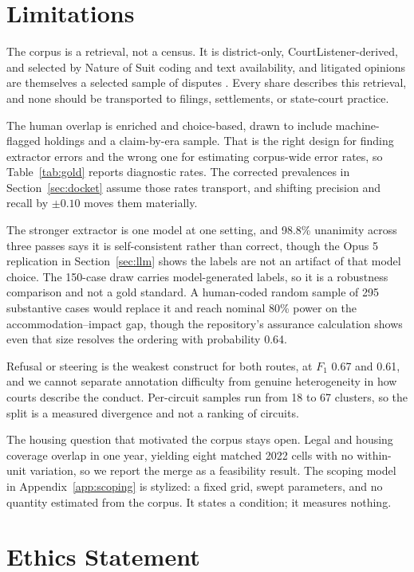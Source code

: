 \documentclass[11pt]{article}
\begin{document}
\section*{Limitations}

The corpus is a retrieval, not a census. It is district-only, CourtListener-derived, and selected by Nature of Suit coding and text availability, and litigated opinions are themselves a selected sample of disputes \citep{priest1984,seicshnaydre2013}. Every share describes this retrieval, and none should be transported to filings, settlements, or state-court practice.

The human overlap is enriched and choice-based, drawn to include machine-flagged holdings and a claim-by-era sample. That is the right design for finding extractor errors and the wrong one for estimating corpus-wide error rates, so Table~\ref{tab:gold} reports diagnostic rates. The corrected prevalences in Section~\ref{sec:docket} assume those rates transport, and shifting precision and recall by $\pm 0.10$ moves them materially.

The stronger extractor is one model at one setting, and 98.8\% unanimity across three passes says it is self-consistent rather than correct, though the Opus 5 replication in Section~\ref{sec:llm} shows the labels are not an artifact of that model choice. The 150-case draw carries model-generated labels, so it is a robustness comparison and not a gold standard. A human-coded random sample of 295 substantive cases would replace it and reach nominal 80\% power on the accommodation--impact gap, though the repository's assurance calculation shows even that size resolves the ordering with probability 0.64.

Refusal or steering is the weakest construct for both routes, at $F_1$ 0.67 and 0.61, and we cannot separate annotation difficulty from genuine heterogeneity in how courts describe the conduct. Per-circuit samples run from 18 to 67 clusters, so the split is a measured divergence and not a ranking of circuits.

The housing question that motivated the corpus stays open. Legal and housing coverage overlap in one year, yielding eight matched 2022 cells with no within-unit variation, so we report the merge as a feasibility result. The scoping model in Appendix~\ref{app:scoping} is stylized: a fixed grid, swept parameters, and no quantity estimated from the corpus. It states a condition; it measures nothing.

\section*{Ethics Statement}
\end{document}
